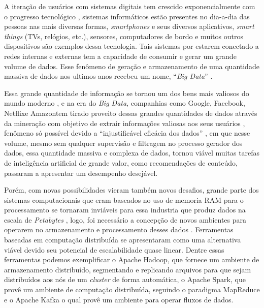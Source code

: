 A iteração de usuários com sistemas digitais tem crescido exponencialmente com
o progresso tecnológico \cite{dean2008mapreduce,atzori2010internet}, sistemas
informáticos estão presentes no dia-a-dia das pessoas nas mais diversas formas,
\textit{smartphones} e seus diversos aplicativos, \textit{smart things} (TVs,
relógios, etc.), sensores, computadores de bordo e muitos outros dispositivos
são exemplos dessa tecnologia. Tais sistemas por estarem conectado a redes
internas e externas tem a capacidade de consumir e gerar um grande volume de
dados. Esse fenômeno de geração e armazenamento de uma quantidade massiva de
dados nos ultimos anos recebeu um nome, ``\textit{Big Data}''
\cite{mcafee2012big}.

Essa grande quantidade de informação se tornou um dos bens mais valiosos do
mundo moderno \cite{economist2017world}, e na era do \textit{Big Data},
companhias como Google\regsymbol, Facebook\regsymbol, Netflix\regsymbol e
Amazon\regsymbol tem tirado proveito dessas grandes quantidades de dados
através da mineração com objetivo de extrair informações valiosas aos seus
usuários \cite{tarnoff2018big, finger2014data}, fenômeno só possível devido a
``injustificável eficácia dos dados'' \cite{halevy2009unreasonable}, em que
nesse volume, mesmo sem qualquer supervisão e filtragem no processo gerador dos
dados, essa quantidade massiva e complexa de dados, tornou viável muitas
tarefas de inteligência artificial de grande valor, como recomendações de
conteúdo, passaram a apresentar um desempenho desejável.

Porém, com novas possibilidades vieram também novos desafios, grande parte dos
sistemas computacionais que eram baseados no uso de memoria RAM para o
processamento se tornaram inviáveis para essa industria que produz dados na
escala de \textit{Petabytes} \cite{dean2008mapreduce}, logo, foi necessário a
concepção de novos ambientes para operarem no armazenamento e processamento
desses dados \cite{gama2007learning}. Ferramentas baseadas em computação
distribuída se apresentaram como uma alternativa viável devido seu potencial de
escalabilidade quase linear. Dentre essas ferramentas podemos exemplificar o
Apache Hadoop\textsuperscript{\tiny\textregistered}, que fornece um ambiente de
armazenamento distribuído, segmentando e replicando arquivos para que sejam
distribuídos aos nós de um \textit{cluster} de forma automática, o Apache
Spark\textsuperscript{\tiny\textregistered}, que provê um ambiente de
computação distribuída, seguindo o paradigma MapReduce e o Apache
Kafka\textsuperscript{\tiny\textregistered} o qual provê um ambiente para
operar fluxos de dados.

